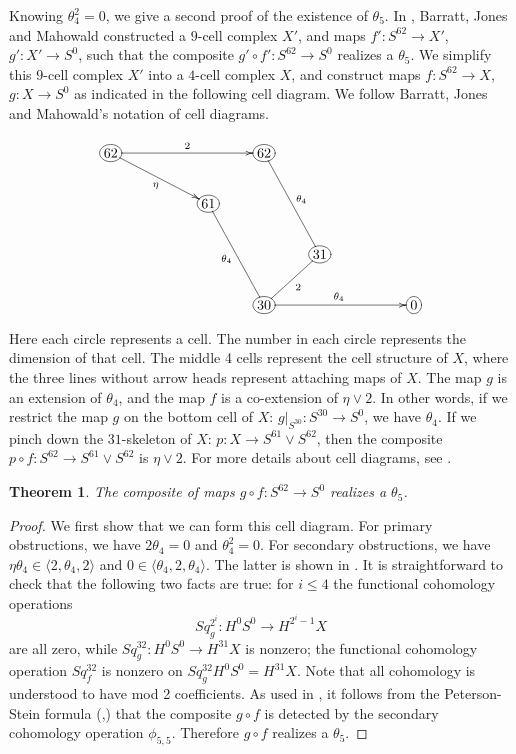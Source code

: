 \documentclass[psamsfonts]{amsart}
\newtheorem{thm}{Theorem}[section]
\theoremstyle{definition}
\numberwithin{equation}{section}
\begin{document}
Knowing $\theta_4^2=0$, we give a second proof of the existence of $\theta_5$. In \cite{BJM1}, Barratt, Jones and Mahowald constructed a $9$-cell complex $X'$, and maps $f':S^{62}\rightarrow X'$, $g':X'\rightarrow S^0$, such that the composite $g'\circ f' : S^{62}\rightarrow S^0$ realizes a $\theta_5$. We simplify this $9$-cell complex $X'$ into a $4$-cell complex $X$, and construct maps $f:S^{62}\rightarrow X$, $g:X\rightarrow S^0$ as indicated in the following cell diagram. We follow Barratt, Jones and Mahowald's notation of cell diagrams.

\begin{displaymath}
    \xymatrix{
   *+[o][F-]{62} \ar[rrr]^{2} \ar[drr]_{\eta} & & & *+[o][F-]{62} \ar@{-}[ddr]^{\theta_4} & & & \\
    & & *+[o][F-]{61} \ar@{-}[ddr]_{\theta_4} &  &  & & \\
  & &  &  & *+[o][F-]{31} \ar@{-}[dl]^{2} & & \\
   & &      &     *+[o][F-]{30} \ar[rrr]^{\theta_4} & & & *+[o][F-]{0} }
\end{displaymath}

Here each circle represents a cell. The number in each circle represents the dimension of that cell. The middle 4 cells represent the cell structure of $X$, where the three lines without arrow heads represent attaching maps of $X$. The map $g$ is an extension of $\theta_4$, and the map $f$ is a co-extension of $\eta\vee 2$. In other words, if we restrict the map $g$ on the bottom cell of $X$: $g|_{S^{30}}:S^{30}\rightarrow S^0$, we have $\theta_4$. If we pinch down the $31$-skeleton of $X$: $p:X\rightarrow S^{61}\vee S^{62}$, then the composite $p\circ f:S^{62}\rightarrow S^{61}\vee S^{62}$ is $\eta \vee 2$. For more details about cell diagrams, see \cite{BJM1}.

\begin{thm}
The composite of maps $g\circ f: S^{62}\rightarrow S^0$ realizes a $\theta_5$.
\end{thm}

\begin{proof}
We first show that we can form this cell diagram. For primary obstructions, we have $2 \theta_4=0$ and $\theta_4^2=0$. For secondary obstructions, we have $\eta\theta_4\in\langle 2, \theta_4, 2\rangle$ and $0\in\langle\theta_4, 2, \theta_4 \rangle$. The latter is shown in \cite{BJM1}. It is straightforward to check that the following two facts are true: for $i\leq 4$ the functional cohomology operations
$$Sq_g^{2^i}:H^0S^0\longrightarrow H^{2^i-1}X$$
are all zero, while $Sq_g^{32}:H^0S^0\rightarrow H^{31}X$ is nonzero; the functional cohomology operation $Sq_f^{32}$ is nonzero on $Sq_g^{32}H^0S^0=H^{31}X$. Note that all cohomology is understood to have mod 2 coefficients. As used in \cite{BJM1}, it follows from the Peterson-Stein formula (\cite{MoT},\cite{PS}) that the composite $g\circ f$ is detected by the secondary cohomology operation $\phi_{5,5}$. Therefore $g\circ f$ realizes a $\theta_5$.
\end{proof}
\end{document}
